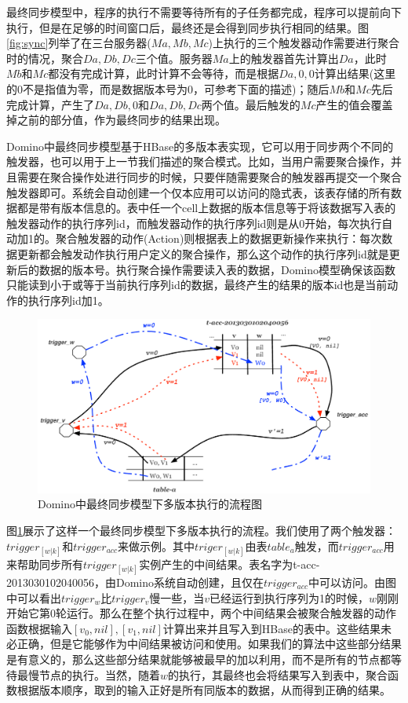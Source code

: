 最终同步模型中，程序的执行不需要等待所有的子任务都完成，程序可以提前向下执行，但是在足够的时间窗口后，最终还是会得到同步执行相同的结果。图\ref{fig:sync}列举了在三台服务器($Ma, Mb, Mc$)上执行的三个触发器动作需要进行聚合时的情况，聚合$Da, Db, Dc$三个值。服务器$Ma$上的触发器首先计算出$Da$，此时$Mb$和$Mc$都没有完成计算，此时计算不会等待，而是根据$Da, 0, 0$计算出结果(这里的0不是指值为零，而是数据版本号为0，可参考下面的描述)；随后$Mb$和$Mc$先后完成计算，产生了$Da, Db, 0$和$Da, Db, Dc$两个值。最后触发的$Mc$产生的值会覆盖掉之前的部分值，作为最终同步的结果出现。

Domino中最终同步模型基于HBase的多版本表实现，它可以用于同步两个不同的触发器，也可以用于上一节我们描述的聚合模式。比如，当用户需要聚合操作，并且需要在聚合操作处进行同步的时候，只要伴随需要聚合的触发器再提交一个聚合触发器即可。系统会自动创建一个仅本应用可以访问的隐式表，该表存储的所有数据都是带有版本信息的。表中任一个cell上数据的版本信息等于将该数据写入表的触发器动作的执行序列id，而触发器动作的执行序列id则是从0开始，每次执行自动加1的。聚合触发器的动作(Action)则根据表上的数据更新操作来执行：每次数据更新都会触发动作执行用户定义的聚合操作，那么这个动作的执行序列id就是更新后的数据的版本号。执行聚合操作需要读入表的数据，Domino模型确保该函数只能读到小于或等于当前执行序列id的数据，最终产生的结果的版本id也是当前动作的执行序列id加1。

\begin{figure}[h!]
\centering
\includegraphics[width=5.5in]{../figures/multiv.pdf}
\caption{Domino中最终同步模型下多版本执行的流程图}
\label{fig:multiv}
\end{figure}


图\ref{fig:multiv}展示了这样一个最终同步模型下多版本执行的流程。我们使用了两个触发器：$trigger_{[w|k]}$和$trigger_{acc}$来做示例。其中$triger_{[w|k]}$由表$table_a$触发，而$trigger_{acc}$用来帮助同步所有$trigger_{[w|k]}$实例产生的中间结果。表名字为t-acc-2013030102040056，由Domino系统自动创建，且仅在$trigger_{acc}$中可以访问。由图中可以看出$trigger_w$比$trigger_v$慢一些，当$v$已经运行到执行序列为1的时候，$w$刚刚开始它第0轮运行。那么在整个执行过程中，两个中间结果会被聚合触发器的动作函数根据输入$[v_0, nil], [v_1, nil]$计算出来并且写入到HBase的表中。这些结果未必正确，但是它能够作为中间结果被访问和使用。如果我们的算法中这些部分结果是有意义的，那么这些部分结果就能够被最早的加以利用，而不是所有的节点都等待最慢节点的执行。当然，随着$w$的执行，其最终也会将结果写入到表中，聚合函数根据版本顺序，取到的输入正好是所有同版本的数据，从而得到正确的结果。

